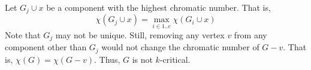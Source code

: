 \begin{enumerate}[label=(\roman*)]
\begin{enumerate}[label=(\alph*)]
\begin{solution}
            Let \(G_j \cup x\) be a component with the highest
            chromatic number. That is, 
            \[
              \chi(G_j \cup x) = \max_{i \in 1..c} \chi(G_i \cup x) 
            \]
            Note that \(G_j\) may not be unique. Still, removing
            any vertex \(v\) from any component other than \(G_j\)
            would not change the chromatic number of \(G-v\).
            That is, \(\chi(G) = \chi(G-v)\). Thus, \(G\) is not
            \(k\)-critical.
          \end{solution}
      \end{enumerate}
  \end{enumerate}
